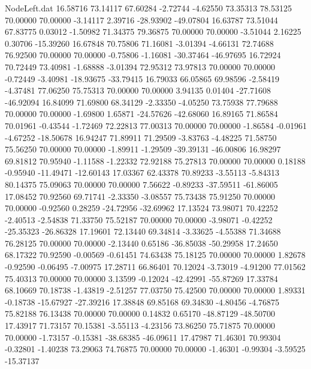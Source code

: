 \begin{filecontents}{NodeLeft.dat}
  16.58716   73.14117   67.60284    -2.72744   -4.62550   73.35313   78.53125   70.00000   70.00000   -3.14117    2.39716  -28.93902  -49.07804
  16.63787   73.51044   67.83775     0.03012   -1.50982   71.34375   79.36875   70.00000   70.00000   -3.51044    2.16225    0.30706  -15.39260
  16.67848   70.75806   71.16081    -3.01394   -4.66131   72.74688   76.92500   70.00000   70.00000   -0.75806   -1.16081  -30.37464  -46.97695
  16.72924   70.72449   73.40981    -1.68888   -3.01394   72.95312   73.97813   70.00000   70.00000   -0.72449   -3.40981  -18.93675  -33.79415
  16.79033   66.05865   69.98596    -2.58419   -4.37481   77.06250   75.75313   70.00000   70.00000    3.94135    0.01404  -27.71608  -46.92094
  16.84099   71.69800   68.34129    -2.33350   -4.05250   73.75938   77.79688   70.00000   70.00000   -1.69800    1.65871  -24.57626  -42.68060
  16.89165   71.86584   70.01961    -0.43544   -1.72469   72.22813   77.00313   70.00000   70.00000   -1.86584   -0.01961   -4.67252  -18.50678
  16.94247   71.89911   71.29509    -3.83763   -4.48225   71.58750   75.56250   70.00000   70.00000   -1.89911   -1.29509  -39.39131  -46.00806
  16.98297   69.81812   70.95940    -1.11588   -1.22332   72.92188   75.27813   70.00000   70.00000    0.18188   -0.95940  -11.49471  -12.60143
  17.03367   62.43378   70.89233    -3.55113   -5.84313   80.14375   75.09063   70.00000   70.00000    7.56622   -0.89233  -37.59511  -61.86005
  17.08452   70.92560   69.71741    -2.33350   -3.08557   75.73438   75.91250   70.00000   70.00000   -0.92560    0.28259  -24.72956  -32.69962
  17.13524   73.98071   70.42252    -2.40513   -2.54838   71.33750   75.52187   70.00000   70.00000   -3.98071   -0.42252  -25.35323  -26.86328
  17.19601   72.13440   69.34814    -3.33625   -4.55388   71.34688   76.28125   70.00000   70.00000   -2.13440    0.65186  -36.85038  -50.29958
  17.24650   68.17322   70.92590    -0.00569   -0.61451   74.63438   75.18125   70.00000   70.00000    1.82678   -0.92590   -0.06495   -7.00975
  17.28711   66.86401   70.12024    -3.73019   -4.91200   77.01562   75.40313   70.00000   70.00000    3.13599   -0.12024  -42.42991  -55.87269
  17.33784   68.10669   70.18738    -1.43819   -2.51257   77.03750   75.42500   70.00000   70.00000    1.89331   -0.18738  -15.67927  -27.39216
  17.38848   69.85168   69.34830    -4.80456   -4.76875   75.82188   76.13438   70.00000   70.00000    0.14832    0.65170  -48.87129  -48.50700
  17.43917   71.73157   70.15381    -3.55113   -4.23156   73.86250   75.71875   70.00000   70.00000   -1.73157   -0.15381  -38.68385  -46.09611
  17.47987   71.46301   70.99304    -0.32801   -1.40238   73.29063   74.76875   70.00000   70.00000   -1.46301   -0.99304   -3.59525  -15.37137

\end{filecontents}

